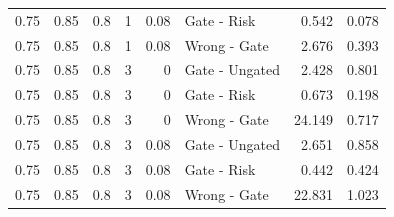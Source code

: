 \begin{longtable}{rrrrrlrr}
0.75 & 0.85 & 0.8 & 1 & 0.08 & Gate - Risk & 0.542 & 0.078\\
0.75 & 0.85 & 0.8 & 1 & 0.08 & Wrong - Gate & 2.676 & 0.393\\
0.75 & 0.85 & 0.8 & 3 & 0 & Gate - Ungated & 2.428 & 0.801\\
0.75 & 0.85 & 0.8 & 3 & 0 & Gate - Risk & 0.673 & 0.198\\
0.75 & 0.85 & 0.8 & 3 & 0 & Wrong - Gate & 24.149 & 0.717\\
0.75 & 0.85 & 0.8 & 3 & 0.08 & Gate - Ungated & 2.651 & 0.858\\
0.75 & 0.85 & 0.8 & 3 & 0.08 & Gate - Risk & 0.442 & 0.424\\
0.75 & 0.85 & 0.8 & 3 & 0.08 & Wrong - Gate & 22.831 & 1.023\\
\end{longtable}\endgroup